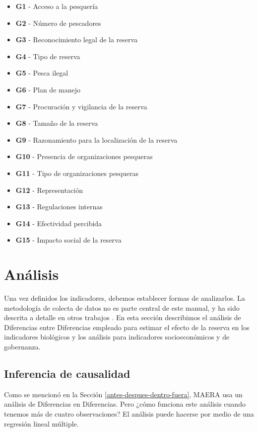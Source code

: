 \documentclass[]{krantz}
\providecommand{\tightlist}{%
  \setlength{\itemsep}{0pt}\setlength{\parskip}{0pt}}
\begin{document}
\begin{itemize}
\tightlist
\item
  \textbf{G1} - Acceso a la pesquería
\item
  \textbf{G2} - Número de pescadores
\item
  \textbf{G3} - Reconocimiento legal de la reserva
\item
  \textbf{G4} - Tipo de reserva
\item
  \textbf{G5} - Pesca ilegal
\item
  \textbf{G6} - Plan de manejo
\item
  \textbf{G7} - Procuración y vigilancia de la reserva
\item
  \textbf{G8} - Tamaño de la reserva
\item
  \textbf{G9} - Razonamiento para la localización de la reserva
\item
  \textbf{G10} - Presencia de organizaciones pesqueras
\item
  \textbf{G11} - Tipo de organizaciones pesqueras
\item
  \textbf{G12} - Representación
\item
  \textbf{G13} - Regulaciones internas
\item
  \textbf{G14} - Efectividad percibida
\item
  \textbf{G15} - Impacto social de la reserva
\end{itemize}

\hypertarget{analisis}{%
\section{Análisis}\label{analisis}}

Una vez definidos los indicadores, debemos establecer formas de analizarlos. La metodología de colecta de datos no es parte central de este manual, y ha sido descrita a detalle en otros trabajos \citep{suman_2010, villaseorderbez_2017, villasenorderbez_2018}. En esta sección describimos el análisis de Diferencias entre Diferencias empleado para estimar el efecto de la reserva en los indicadores biológicos y los análisis para indicadores socioeconómicos y de gobernanza.

\hypertarget{inferencia-de-causalidad}{%
\subsection{Inferencia de causalidad}\label{inferencia-de-causalidad}}

Como se mencionó en la Sección \ref{antes-despues-dentro-fuera}, MAERA usa un análisis de Diferencias en Diferencias. Pero ¿cómo funciona este análisis cuando tenemos más de cuatro observaciones? El análisis puede hacerse por medio de una regresión lineal múltiple.
\end{document}
